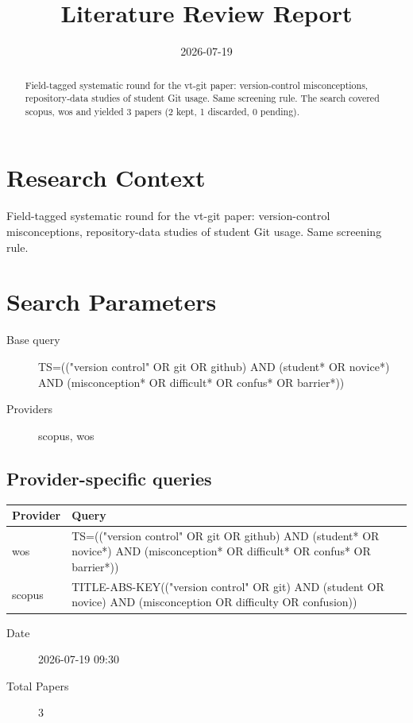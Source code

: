 \documentclass{article}
\title{Literature Review Report}
\date{2026-07-19}
\begin{document}
\maketitle

\begin{abstract}
Field-tagged systematic round for the vt-git paper: version-control misconceptions, repository-data studies of student Git usage. Same screening rule. The search covered scopus, wos and yielded 3 papers (2 kept, 1 discarded, 0 pending).
\end{abstract}
\clearpage
\clearpage
\tableofcontents
\clearpage

\section{Research Context}
Field-tagged systematic round for the vt-git paper: version-control
misconceptions, repository-data studies of student Git usage. Same
screening rule.

\section{Search Parameters}

\begin{description}
\item[Base query] TS=(("version control" OR git OR github) AND (student* OR novice*) AND (misconception* OR difficult* OR confus* OR barrier*))
\item[Providers] scopus, wos
\end{description}

\subsection{Provider-specific queries}
\begin{longtable}{lp{10cm}}
\toprule
Provider & Query \\
\midrule
wos & TS=(("version control" OR git OR github) AND (student* OR novice*) AND (misconception* OR difficult* OR confus* OR barrier*)) \\
scopus & TITLE-ABS-KEY(("version control" OR git) AND (student OR novice) AND (misconception OR difficulty OR confusion)) \\
\bottomrule
\end{longtable}

\begin{description}
\item[Date] 2026-07-19 09:30
\item[Total Papers] 3
\end{description}
\end{document}
